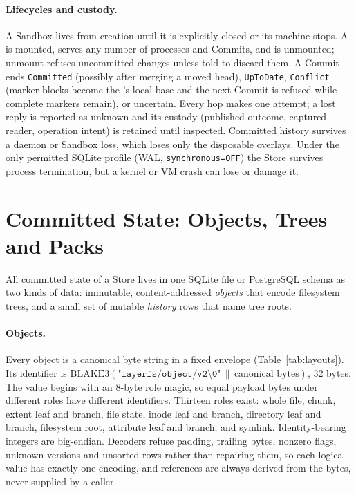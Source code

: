\paragraph{Lifecycles and custody.} A Sandbox lives from creation until it is explicitly
closed or its machine stops. A \ws{} is mounted, serves any number of processes and
Commits, and is unmounted; unmount refuses uncommitted changes unless told to discard
them. A Commit ends \texttt{Committed} (possibly after merging a moved head),
\texttt{UpToDate}, \texttt{Conflict} (marker blocks become the \ws{}'s local base and the
next Commit is refused while complete markers remain), or uncertain. Every hop makes one
attempt; a lost reply is reported as unknown and its custody (published outcome,
captured reader, operation intent) is retained until inspected. Committed history
survives a daemon or Sandbox loss, which loses only the disposable overlays. Under the
only permitted SQLite profile (WAL, \texttt{synchronous=OFF}) the Store survives process
termination, but a kernel or VM crash can lose or damage it.

\section{Committed State: Objects, Trees and Packs}
\label{app:objects}

All committed state of a Store lives in one SQLite file or PostgreSQL schema as two kinds
of data: immutable, content-addressed \emph{objects} that encode filesystem trees, and a
small set of mutable \emph{history} rows that name tree roots.

\paragraph{Objects.} Every object is a canonical byte string in a fixed envelope
(Table~\ref{tab:layouts}). Its identifier is
$\mathrm{BLAKE3}(\texttt{"layerfs/object/v2\textbackslash 0"} \,\|\, \text{canonical
bytes})$, 32 bytes. The value begins with an 8-byte role magic, so equal payload bytes
under different roles have different identifiers. Thirteen roles exist: whole file,
chunk, extent leaf and branch, file state, inode leaf and branch, directory leaf and
branch, filesystem root, attribute leaf and branch, and symlink. Identity-bearing integers
are big-endian. Decoders refuse padding, trailing bytes, nonzero flags, unknown versions
and unsorted rows rather than repairing them, so each logical value has exactly one
encoding, and references are always derived from the bytes, never supplied by a caller.

